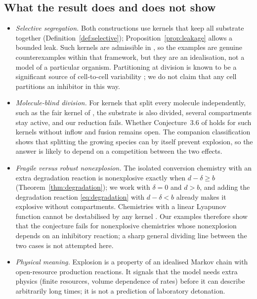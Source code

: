\documentclass[11pt,a4paper]{article}
\numberwithin{equation}{section}
\theoremstyle{definition}\newtheorem{definition}[theorem]{Definition}
\theoremstyle{remark}\newtheorem{remark}[theorem]{Remark}\newtheorem{example}[theorem]{Example}
\begin{document}
\subsection{What the result does and does not show}
\begin{itemize}
\item \emph{Selective segregation.} Both constructions use kernels that keep all substrate together (Definition~\ref{def:selective}); Proposition~\ref{prop:leakage} allows a bounded leak. Such kernels are admissible in \cite{AHRLL2026}, so the examples are genuine counterexamples within that framework, but they are an idealisation, not a model of a particular organism. Partitioning at division is known to be a significant source of cell-to-cell variability \cite{HuhPaulsson2011}; we do not claim that any cell partitions an inhibitor in this way.
\item \emph{Molecule-blind division.} For kernels that split every molecule independently, such as the fair kernel of \cite{AHRLL2026}, the substrate is also divided, several compartments stay active, and our reduction fails. Whether Conjecture~3.6 of \cite{AHRLL2026} holds for such kernels without inflow and fusion remains open. The companion classification \cite{EP2026companion} shows that splitting the growing species can by itself prevent explosion, so the answer is likely to depend on a competition between the two effects.
\item \emph{Fragile versus robust nonexplosion.} The isolated conversion chemistry with an extra degradation reaction is nonexplosive exactly when $d-\delta\ge b$ (Theorem~\ref{thm:degradation}); we work with $\delta=0$ and $d>b$, and adding the degradation reaction \eqref{eq:degradation} with $d-\delta<b$ already makes it explosive without compartments. Chemistries with a linear Lyapunov function cannot be destabilised by any kernel \cite[Theorem~3.1]{AHRLL2026}. Our examples therefore show that the conjecture fails for nonexplosive chemistries whose nonexplosion depends on an inhibitory reaction; a sharp general dividing line between the two cases is not attempted here.
\item \emph{Physical meaning.} Explosion is a property of an idealised Markov chain with open-resource production reactions. It signals that the model needs extra physics (finite resources, volume dependence of rates) before it can describe arbitrarily long times; it is not a prediction of laboratory detonation.
\end{itemize}
\end{document}
